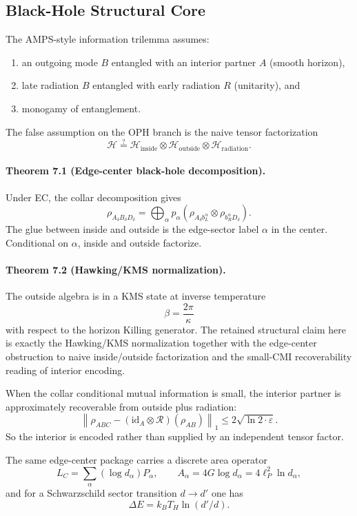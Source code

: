 \subsection{Black-Hole Structural Core}

The AMPS-style information trilemma assumes:
\begin{enumerate}[leftmargin=2em]
\item an outgoing mode \(B\) entangled with an interior partner \(A\) (smooth horizon),
\item late radiation \(B\) entangled with early radiation \(R\) (unitarity), and
\item monogamy of entanglement.
\end{enumerate}
The false assumption on the OPH branch is the naive tensor factorization
\[
\mathcal H \stackrel{?}{=}
\mathcal H_{\mathrm{inside}}\otimes
\mathcal H_{\mathrm{outside}}\otimes
\mathcal H_{\mathrm{radiation}}.
\]

\paragraph{\textbf{Theorem 7.1 (Edge-center black-hole decomposition).}}
Under EC, the collar decomposition gives
\[
\rho_{A_\delta B_\delta D_\delta}
=
\bigoplus_\alpha p_\alpha
\left(\rho_{A_\delta b_L^\alpha}\otimes \rho_{b_R^\alpha D_\delta}\right).
\]
The glue between inside and outside is the edge-sector label \(\alpha\) in the center.
Conditional on \(\alpha\), inside and outside factorize.

\paragraph{\textbf{Theorem 7.2 (Hawking/KMS normalization).}}
The outside algebra is in a KMS state at inverse temperature
\[
\beta=\frac{2\pi}{\kappa}
\]
with respect to the horizon Killing generator. The retained structural claim here is exactly the
Hawking/KMS normalization together with the edge-center obstruction to naive
inside/outside factorization and the small-CMI recoverability reading of interior encoding.

When the collar conditional mutual information is small, the interior partner is approximately
recoverable from outside plus radiation:
\[
\left\|
\rho_{ABC}
-
(\mathrm{id}_A\otimes\mathcal R)(\rho_{AB})
\right\|_1
\le
2\sqrt{\ln 2\cdot \varepsilon}.
\]
So the interior is encoded rather than supplied by an independent tensor factor.

The same edge-center package carries a discrete area operator
\[
L_C=\sum_\alpha (\log d_\alpha)P_\alpha,
\qquad
A_\alpha=4G\log d_\alpha=4\ell_P^2\ln d_\alpha,
\]
and for a Schwarzschild sector transition \(d\to d'\) one has
\[
\Delta E=k_B T_H\ln(d'/d).
\]

